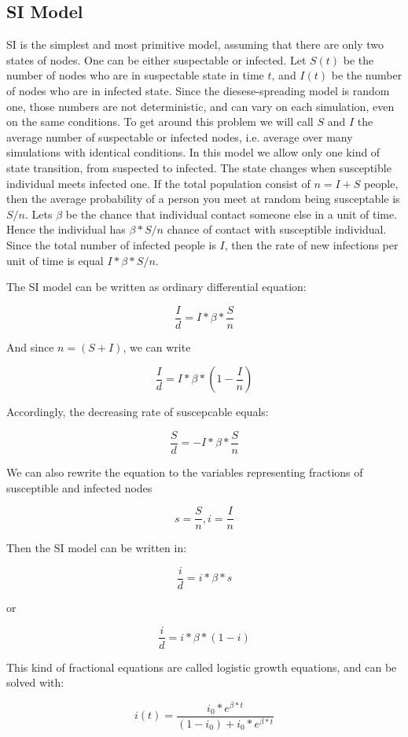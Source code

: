 \documentclass[nostrict]{szablonPG}
\begin{document}
\subsection{SI Model}
SI is the simplest and most primitive model, assuming that there are only two states of nodes. One can be either suspectable or infected. Let $S(t)$ be the number of nodes who are in suspectable state in time $t$, and $I(t)$ be the number of nodes who are in infected state. Since the diesese-spreading model is random one, those numbers are not deterministic, and can vary on each simulation, even on the same conditions. To get around this problem we will call $S$ and $I$ the average number of suspectable or infected nodes, i.e. average over many simulations with identical conditions.
In this model we allow only one kind of state transition, from suspected to infected. The state changes when susceptible individual meets infected one. If the total population consist of $n = I + S$ people, then the average probability of a person you meet at random being susceptable is $S/n$.
Lets $\beta$ be the chance that individual contact someone else in a unit of time. 
Hence the individual has $\beta*S/n$ chance of contact with susceptible individual.
Since the total number of infected people is $I$, then the rate of new infections per unit of time is equal $I * \beta*S/n$.

The SI model can be written as ordinary differential equation:

\[\frac{I}{d} = I * \beta * \frac{S}{n}\]

And since $n = (S + I)$, we can write 

\[\frac{I}{d} = I * \beta * (1 - \frac{I}{n})\]

Accordingly, the decreasing rate of suscepcable equals:

\[\frac{S}{d} = - I * \beta * \frac{S}{n}\]

We can also rewrite the equation to the variables representing fractions of susceptible and infected nodes

\[s = \frac{S}{n}, i = \frac{I}{n}\]

Then the SI model can be written in:

\[\frac{i}{d} = i*\beta*s\]

or 

\[\frac{i}{d} = i * \beta * (1-i)\]

This kind of fractional equations are called logistic growth equations, and can be solved with:

\[i(t) =\frac{ i_0 * e^{\beta*t} }{(1 - i_0) + i_0 * e^{\beta*t}}\]
\end{document}
